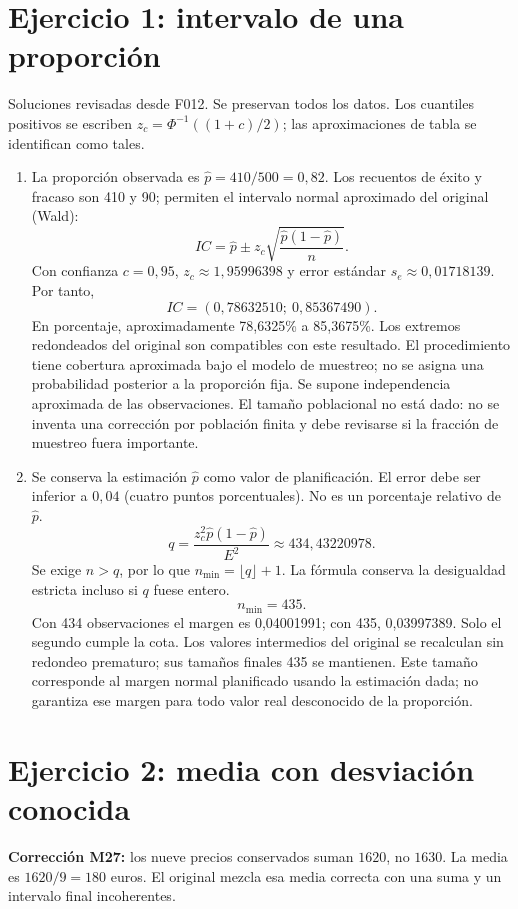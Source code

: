 \documentclass[11pt]{article}
\begin{document}
\section*{Ejercicio 1: intervalo de una proporción}
Soluciones revisadas desde F012. Se preservan todos los datos. Los cuantiles positivos se escriben $z_c=\Phi^{-1}((1+c)/2)$; las aproximaciones de tabla se identifican como tales.
\begin{enumerate}[label=(\alph*)]\item La proporción observada es $\widehat p=410/500=0,82$. Los recuentos de éxito y fracaso son 410 y 90; permiten el intervalo normal aproximado del original (Wald):
\[IC=\widehat p\pm z_c\sqrt{\frac{\widehat p(1-\widehat p)}{n}}.\]
Con confianza $c=0,95$, $z_c\approx1,95996398$ y error estándar $s_e\approx0,01718139$. Por tanto,
\[IC=\boxed{(0,78632510;\ 0,85367490)}.\]
En porcentaje, aproximadamente 78,6325\% a 85,3675\%. Los extremos redondeados del original son compatibles con este resultado.
El procedimiento tiene cobertura aproximada bajo el modelo de muestreo; no se asigna una probabilidad posterior a la proporción fija. Se supone independencia aproximada de las observaciones. El tamaño poblacional no está dado: no se inventa una corrección por población finita y debe revisarse si la fracción de muestreo fuera importante.
\item Se conserva la estimación $\widehat p$ como valor de planificación. El error debe ser inferior a $0,04$ (cuatro puntos porcentuales). No es un porcentaje relativo de $\widehat p$.
\[q=\frac{z_c^2\widehat p(1-\widehat p)}{E^2}\approx434,43220978.\]
Se exige $n>q$, por lo que $n_{\min}=\lfloor q\rfloor+1$. La fórmula conserva la desigualdad estricta incluso si $q$ fuese entero.
\[\boxed{n_{\min}=435}.\]
Con 434 observaciones el margen es 0,04001991; con 435, 0,03997389. Solo el segundo cumple la cota.
Los valores intermedios del original se recalculan sin redondeo prematuro; sus tamaños finales 435 se mantienen. Este tamaño corresponde al margen normal planificado usando la estimación dada; no garantiza ese margen para todo valor real desconocido de la proporción.
\end{enumerate}
\clearpage\section*{Ejercicio 2: media con desviación conocida}
\textbf{Corrección M27:} los nueve precios conservados suman $1620$, no $1630$. La media es $1620/9=180$ euros. El original mezcla esa media correcta con una suma y un intervalo final incoherentes.
\end{document}
